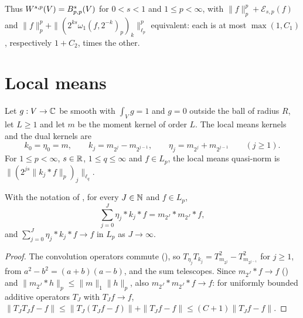 Thus $W^{s,p}(V) = B^{s}_{p,p}(V)$ for $0 < s < 1$ and $1 \leq p < \infty$, with
$\|f\|_p^p + \mathcal{E}_{s,p}(f)$ and
$\|f\|_p^p + \|(2^{ks} \omega_1(f, 2^{-k})_p)_k\|_{\ell_p}^p$ equivalent: each is at most
$\max(1, C_1)$, respectively $1 + C_2$, times the other.

\section{Local means}
\label{sec:rd-local-means}

\begin{definition}
\label{def:local-means}
\leanok
{}
Let $g : V \to \mathbb{C}$ be smooth with $\int_V g = 1$ and $g = 0$ outside the ball of radius $R$, let
$L \geq 1$ and let $m$ be the moment kernel of order $L$. The local means kernels and the dual
kernels are
\[
  k_0 = \eta_0 = m, \qquad k_j = m_{2^j} - m_{2^{j-1}}, \qquad \eta_j = m_{2^j} + m_{2^{j-1}}
  \qquad (j \geq 1) .
\]
For $1 \leq p < \infty$, $s \in \mathbb{R}$, $1 \leq q \leq \infty$ and $f \in L_p$, the local means
quasi-norm is $\|(2^{js} \|k_j * f\|_p)_j\|_{\ell_q}$.
\end{definition}

\begin{lemma}
\label{lem:reproducing-formula}
\leanok
{}
With the notation of , for every $J \in \mathbb{N}$ and $f \in L_p$,
\[
  \sum_{j=0}^J \eta_j * k_j * f = m_{2^J} * m_{2^J} * f ,
\]
and $\sum_{j=0}^J \eta_j * k_j * f \to f$ in $L_p$ as $J \to \infty$.
\end{lemma}

\begin{proof}
\leanok
The convolution operators commute (), so
$T_{\eta_j} T_{k_j} = T_{m_{2^j}}^2 - T_{m_{2^{j-1}}}^2$ for $j \geq 1$, from
$a^2 - b^2 = (a + b)(a - b)$, and the sum telescopes. Since $m_{2^J} * f \to f$
() and $\|m_{2^J} * h\|_p \leq \|m\|_1 \|h\|_p$, also
$m_{2^J} * m_{2^J} * f \to f$: for uniformly bounded additive operators $T_J$ with $T_J f \to f$,
$\|T_J T_J f - f\| \leq \|T_J (T_J f - f)\| + \|T_J f - f\| \leq (C + 1) \|T_J f - f\|$.
\end{proof}

